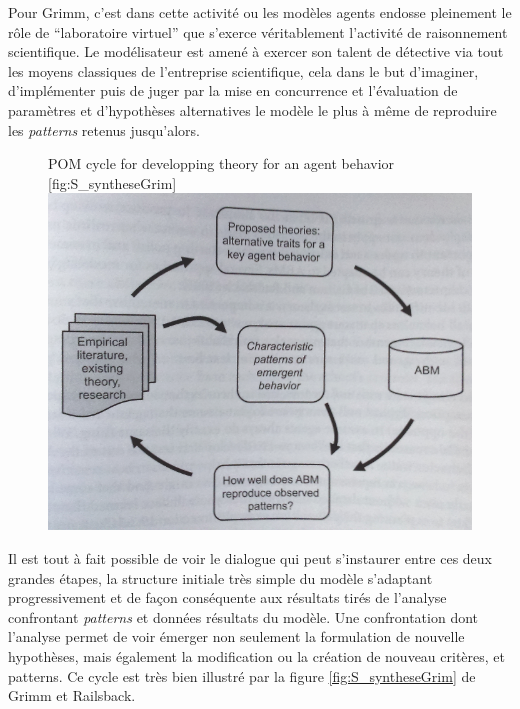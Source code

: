 Pour Grimm, c'est dans cette activité ou les modèles agents endosse pleinement le rôle de \enquote{laboratoire virtuel} que s'exerce véritablement l'activité de raisonnement scientifique. Le modélisateur est amené à exercer son talent de détective via tout les moyens classiques de l'entreprise scientifique, cela dans le but d'imaginer, d'implémenter puis de juger par la mise en concurrence et l'évaluation de paramètres et d'hypothèses alternatives le modèle le plus à même de reproduire les \textit{patterns} retenus jusqu'alors. 

\begin{figure}[h]
\begin{sidecaption}[fortoc]{ POM cycle for developping theory for an agent behavior \autocite[245]{Railsback2012}}[fig:S_syntheseGrim]
  \centering
 \includegraphics[width=.9\linewidth]{cyclePOMcomportement.png}
  \end{sidecaption}
\end{figure}

Il est tout à fait possible de voir le dialogue qui peut s'instaurer entre ces deux grandes étapes, la structure initiale très simple du modèle s'adaptant progressivement et de façon conséquente aux résultats tirés de l'analyse confrontant \textit{patterns} et données résultats du modèle. Une confrontation dont l'analyse permet de voir émerger non seulement la formulation de nouvelle hypothèses, mais également la modification ou la création de nouveau critères, et patterns. Ce cycle est très bien illustré par la figure \ref{fig:S_syntheseGrim} de Grimm et Railsback.

